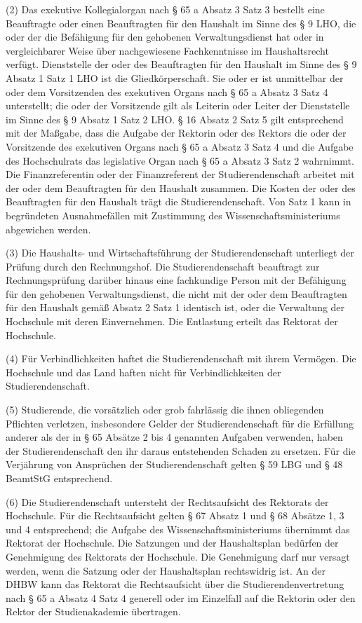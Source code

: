 \documentclass[
10pt,
a4paper,
twoside,								%
titlepage=false,							%
draft=false								%
]{scrartcl}
\begin{document}
(2) Das exekutive Kollegialorgan nach § 65 a Absatz 3 Satz 3 bestellt eine Beauftragte oder einen Beauftragten für den Haushalt im Sinne des § 9 LHO, die oder der die Befähigung für den gehobenen Verwaltungsdienst hat oder in vergleichbarer Weise über nachgewiesene Fachkenntnisse im Haushaltsrecht verfügt. Dienststelle der oder des Beauftragten für den Haushalt im Sinne des § 9 Absatz 1 Satz 1 LHO ist die Gliedkörperschaft. Sie oder er ist unmittelbar der oder dem Vorsitzenden des exekutiven Organs nach § 65 a Absatz 3 Satz 4 unterstellt; die oder der Vorsitzende gilt als Leiterin oder Leiter der Dienststelle im Sinne des § 9 Absatz 1 Satz 2 LHO. § 16 Absatz 2 Satz 5 gilt entsprechend mit der Maßgabe, dass die Aufgabe der Rektorin oder des Rektors die oder der Vorsitzende des exekutiven Organs nach § 65 a Absatz 3 Satz 4 und die Aufgabe des Hochschulrats das legislative Organ nach § 65 a Absatz 3 Satz 2 wahrnimmt. Die Finanzreferentin oder der Finanzreferent der Studierendenschaft arbeitet mit der oder dem Beauftragten für den Haushalt zusammen. Die Kosten der oder des Beauftragten für den Haushalt trägt die Studierendenschaft. Von Satz 1 kann in begründeten Ausnahmefällen mit Zustimmung des Wissenschaftsministeriums abgewichen werden.

(3) Die Haushalts- und Wirtschaftsführung der Studierendenschaft unterliegt der Prüfung durch den Rechnungshof. Die Studierendenschaft beauftragt zur Rechnungsprüfung darüber hinaus eine fachkundige Person mit der Befähigung für den gehobenen Verwaltungsdienst, die nicht mit der oder dem Beauftragten für den Haushalt gemäß Absatz 2 Satz 1 identisch ist, oder die Verwaltung der Hochschule mit deren Einvernehmen. Die Entlastung erteilt das Rektorat der Hochschule.

(4) Für Verbindlichkeiten haftet die Studierendenschaft mit ihrem Vermögen. Die Hochschule und das Land haften nicht für Verbindlichkeiten der Studierendenschaft.

(5) Studierende, die vorsätzlich oder grob fahrlässig die ihnen obliegenden Pflichten verletzen, insbesondere Gelder der Studierendenschaft für die Erfüllung anderer als der in § 65 Absätze 2 bis 4 genannten Aufgaben verwenden, haben der Studierendenschaft den ihr daraus entstehenden Schaden zu ersetzen. Für die Verjährung von Ansprüchen der Studierendenschaft gelten § 59 LBG und § 48 BeamtStG entsprechend.

(6) Die Studierendenschaft untersteht der Rechtsaufsicht des Rektorats der Hochschule. Für die Rechtsaufsicht gelten § 67 Absatz 1 und § 68 Absätze 1, 3 und 4 entsprechend; die Aufgabe des Wissenschaftsministeriums übernimmt das Rektorat der Hochschule. Die Satzungen und der Haushaltsplan bedürfen der Genehmigung des Rektorats der Hochschule. Die Genehmigung darf nur versagt werden, wenn die Satzung oder der Haushaltsplan rechtswidrig ist. An der DHBW kann das Rektorat die Rechtsaufsicht über die Studierendenvertretung nach § 65 a Absatz 4 Satz 4 generell oder im Einzelfall auf die Rektorin oder den Rektor der Studienakademie übertragen.
\end{document}
